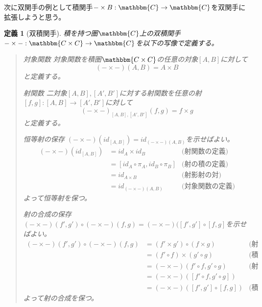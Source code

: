 \documentclass[uplatex,dvipdfmx]{jsarticle}
\newcommand{\cat}[1]{\mathbbm{#1}}
\newcommand{\arrow}{\rightarrow}
\newcommand{\functor}[3]{#1:\cat{#2}\arrow \cat{#3}}
\newcommand{\mor}[3]{#1:#2\arrow #3}
\newcommand{\pcobj}[1]{[#1]}
\newtheorem{define}[proof]{定義}
\numberwithin{proof}{subsection}
\newenvironment{mydescription}
{\begin{description}
  \setlength{\parskip}{0.5cm}
}
{\end{description}}
\begin{document}
	次に双関手の例として積関手$\functor{-\times B}{C}{C}$を双関手に拡張しようと思う。
	\begin{define}[双積関手]
		積を持つ圏$\cat{C}$上の双積関手$\functor{-\times -}{C\times C}{C}$を以下の写像で定義する。
		\begin{quote}
			\begin{mydescription}
				\item[対象関数] 対象関数を積圏$\cat{C\times C}$の任意の対象$\pcobj{A,B}$に対して\[(-\times -)(A,B)=A\times B\]と定義する。
				\item[射関数] 二対象$\pcobj{A,B},\pcobj{A',B'}$に対する射関数を任意の射$\mor{\pcobj{f,g}}{\pcobj{A,B}}{\pcobj{A',B'}}$に対して\[(-\times -)_{\pcobj{A,B},\pcobj{A',B'}}(f,g)=f\times g\]と定義する。
				\begin{center}
				\end{center}

				\item[恒等射の保存] $(-\times -)(id_{\pcobj{A,B}})=id_{(-\times-)(A,B)}$を示せばよい。
				\begin{align*}
					(-\times -)(id_{\pcobj{A,B}})&=id_A\times id_B&\text{(射関数の定義)}\\
					&=\pcobj{id_A\circ\pi_A,id_B\circ\pi_B}&\text{(射の積の定義)}\\
					&=id_{A\times B}&\text{(射影射の対)}\\
					&=id_{(-\times-)(A,B)}&\text{(対象関数の定義)}
				\end{align*}
				よって恒等射を保つ。
				\item[射の合成の保存] $(-\times -)(f',g')\circ(-\times-)(f,g)=(-\times-)(\pcobj{f',g'}\circ\pcobj{f,g}$を示せばよい。
				\begin{align*}
					(-\times -)(f',g')\circ(-\times-)(f,g)&=(f'\times g')\circ(f\times g)&\text{(射関数の定義)}\\
					&=(f'\circ f)\times(g'\circ g)&\text{(積と合成の交換)}\\
					&=(-\times-)(f'\circ f,g'\circ g)&\text{(射関数の定義)}\\
					&=(-\times-)(\pcobj{f'\circ f,g'\circ g})\\
					&=(-\times-)(\pcobj{f',g'}\circ\pcobj{f,g})&\text{(積圏の射の合成の定義)}
				\end{align*}
				よって射の合成を保つ。
			\end{mydescription}
		\end{quote}
	\end{define}
\end{document}
